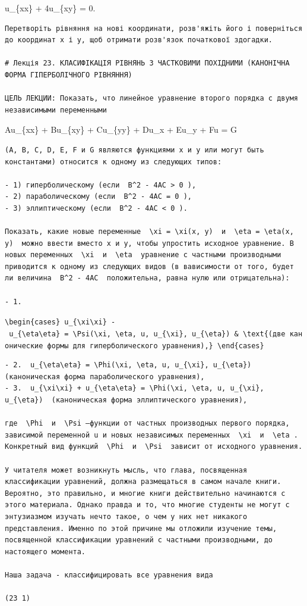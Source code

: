 \documentclass[
  ukrainian,
]{article}
\begin{document}
u\_\{xx\} + 4u\_\{xy\} = 0.

\begin{verbatim}
Перетворіть рівняння на нові координати, розв'яжіть його і поверніться до координат x і y, щоб отримати розв'язок початкової здогадки.

# Лекція 23. КЛАСИФІКАЦІЯ РІВНЯНЬ З ЧАСТКОВИМИ ПОХІДНИМИ (КАНОНІЧНА ФОРМА ГІПЕРБОЛІЧНОГО РІВНЯННЯ)

ЦЕЛЬ ЛЕКЦИИ: Показать, что линейное уравнение второго порядка с двумя независимыми переменными
\end{verbatim}

Au\_\{xx\} + Bu\_\{xy\} + Cu\_\{yy\} + Du\_x + Eu\_y + Fu = G

\begin{verbatim}
(A, B, C, D, E, F и G являются функциями x и y или могут быть константами) относится к одному из следующих типов:

- 1) гиперболическому (если  B^2 - 4AC > 0 ),
- 2) параболическому (если  B^2 - 4AC = 0 ),
- 3) эллиптическому (если  B^2 - 4AC < 0 ).

Показать, какие новые переменные  \xi = \xi(x, y)  и  \eta = \eta(x, y)  можно ввести вместо x и y, чтобы упростить исходное уравнение. В новых переменных  \xi  и  \eta  уравнение с частными производными приводится к одному из следующих видов (в вависимости от того, будет ли величина  B^2 - 4AC  положительна, равна нулю или отрицательна):

- 1.
\end{verbatim}

\texttt{\textbackslash{}begin\{cases\}\ u\_\{\textbackslash{}xi\textbackslash{}xi\}\ -\ u\_\{\textbackslash{}eta\textbackslash{}eta\}\ =\ \textbackslash{}Psi(\textbackslash{}xi,\ \textbackslash{}eta,\ u,\ u\_\{\textbackslash{}xi\},\ u\_\{\textbackslash{}eta\})\ \&\ \textbackslash{}text\{(две\ канонические\ формы\ для\ гиперболического\ уравнения),\}\ \textbackslash{}end\{cases\}}

\begin{verbatim}
- 2.  u_{\eta\eta} = \Phi(\xi, \eta, u, u_{\xi}, u_{\eta})  (каноническая форма параболического уравнения),
- 3.  u_{\xi\xi} + u_{\eta\eta} = \Phi(\xi, \eta, u, u_{\xi}, u_{\eta})  (каноническая форма эллиптического уравнения),

где  \Phi  и  \Psi —функции от частных производных первого порядка, зависимой переменной u и новых независимых переменных  \xi  и  \eta . Конкретный вид функций  \Phi  и  \Psi  зависит от исходного уравнения.

У читателя может возникнуть мысль, что глава, посвященная классификации уравнений, должна размещаться в самом начале книги. Вероятно, это правильно, и многие книги действительно начинаются с этого материала. Однако правда и то, что многие студенты не могут с энтузиазмом изучать нечто такое, о чем у них нет никакого представления. Именно по этой причине мы отложили изучение темы, посвященной классификации уравнений с частными производными, до настоящего момента.

Наша задача - классифицировать все уравнения вида

(23 1)
\end{verbatim}
\end{document}
